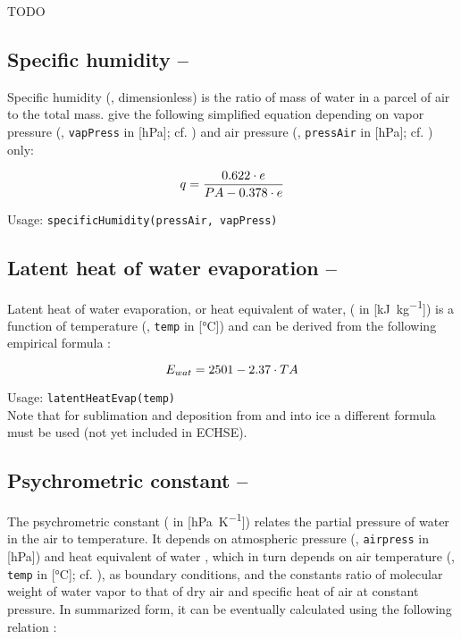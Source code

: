 TODO


\subsection{Specific humidity -- \specHumidity} \label{sec:meteo:spechum}
Specific humidity (\specHumidity{}, dimensionless) is the ratio of mass of water in a parcel of air to the total mass. \citet{Dyck1995} give the following simplified equation depending on vapor pressure (\vaporPressure{}, \verb!vapPress! in [\si{\hecto\pascal}]; cf. ) and air pressure (\airPressure{}, \verb!pressAir! in [\si{\hecto\pascal}]; cf. ) only:

\begin{equation} \label{eqn:meteo:spechum}
q{} = \frac{0.622 \cdot e{}}{PA{} - 0.378 \cdot e{}}
\end{equation}

\noindent
Usage:
\verb!specificHumidity(pressAir, vapPress)!\\


\subsection{Latent heat of water evaporation -- \evapHeatWater} \label{sec:meteo:evapheat}
Latent heat of water evaporation, or heat equivalent of water, (\evapHeatWater{} in [\si{\kilo\joule\per\kilo\gram}]) is a function of temperature (\airtemp{}, \verb!temp! in [\si{\degreeCelsius}]) and can be derived from the following empirical formula \citep{Dyck1995}:

\begin{equation} \label{eqn:meteo:evapheat}
E_{wat}{} = 2501 - 2.37 \cdot TA{}
\end{equation}

\noindent
Usage:
\verb!latentHeatEvap(temp)!\\

Note that for sublimation and deposition from and into ice a different formula must be used (not yet included in ECHSE).


\subsection{Psychrometric constant -- \psychroConst} \label{sec:meteo:psychro}
The psychrometric constant (\psychroConst{} in [\si{\hecto\pascal\per\kelvin}]) relates the partial pressure of water in the air to temperature. It depends on atmospheric pressure (\airPressure{}, \verb!airpress! in [\si{\hecto\pascal}]) and heat equivalent of water \evapHeatWater{}, which in turn depends on air temperature (\airtemp{}, \verb!temp! in [\si{\degreeCelsius}]; cf. ), as boundary conditions, and the constants ratio of molecular weight of water vapor to that of dry air and specific heat of air at constant pressure. In summarized form, it can be eventually calculated using the following relation \citep{Dyck1995}:

